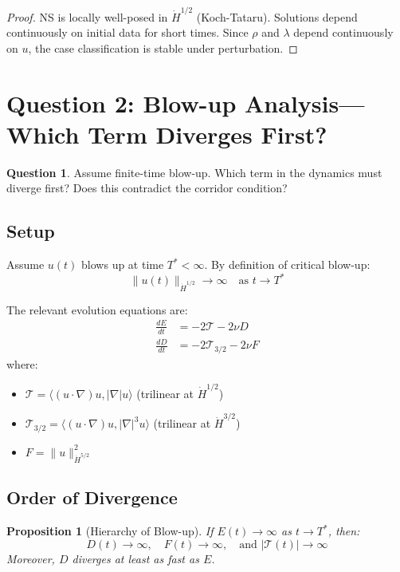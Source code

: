 \documentclass[11pt]{article}
\newtheorem{proposition}[theorem]{Proposition}
\theoremstyle{definition}
\newtheorem{question}{Question}
\begin{document}
\begin{proof}
NS is locally well-posed in $\dot{H}^{1/2}$ (Koch-Tataru). Solutions depend continuously on initial data for short times. Since $\rho$ and $\lambda$ depend continuously on $u$, the case classification is stable under perturbation.
\end{proof}

\section{Question 2: Blow-up Analysis---Which Term Diverges First?}

\begin{question}
Assume finite-time blow-up. Which term in the dynamics must diverge first? Does this contradict the corridor condition?
\end{question}

\subsection{Setup}

Assume $u(t)$ blows up at time $T^* < \infty$. By definition of critical blow-up:
\[
\|u(t)\|_{\dot{H}^{1/2}} \to \infty \quad \text{as } t \to T^*
\]

The relevant evolution equations are:
\begin{align}
\frac{dE}{dt} &= -2\mathcal{T} - 2\nu D \label{eq:E-evol} \\
\frac{dD}{dt} &= -2\mathcal{T}_{3/2} - 2\nu F \label{eq:D-evol}
\end{align}
where:
\begin{itemize}
\item $\mathcal{T} = \langle (u \cdot \nabla)u, |\nabla|u \rangle$ (trilinear at $\dot{H}^{1/2}$)
\item $\mathcal{T}_{3/2} = \langle (u \cdot \nabla)u, |\nabla|^3 u \rangle$ (trilinear at $\dot{H}^{3/2}$)
\item $F = \|u\|_{\dot{H}^{5/2}}^2$
\end{itemize}

\subsection{Order of Divergence}

\begin{proposition}[Hierarchy of Blow-up]\label{prop:hierarchy}
If $E(t) \to \infty$ as $t \to T^*$, then:
\[
D(t) \to \infty, \quad F(t) \to \infty, \quad \text{and } |\mathcal{T}(t)| \to \infty
\]
Moreover, $D$ diverges at least as fast as $E$.
\end{proposition}
\end{document}
